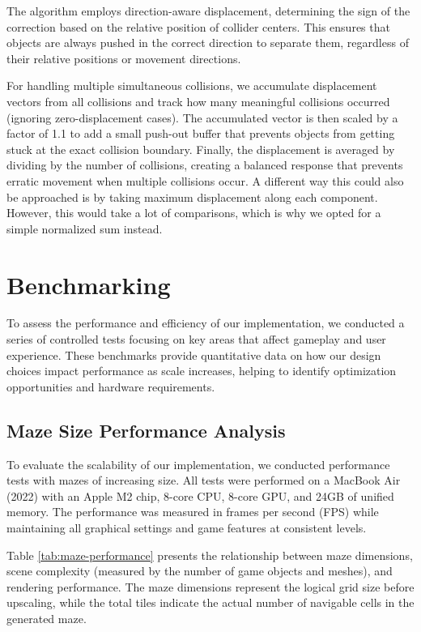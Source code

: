 \documentclass{article}
\begin{document}
The algorithm employs direction-aware displacement, determining the sign of the
correction based on the relative position of collider centers. This ensures
that objects are always pushed in the correct direction to separate them,
regardless of their relative positions or movement directions.

For handling multiple simultaneous collisions, we accumulate displacement
vectors from all collisions and track how many meaningful collisions occurred
(ignoring zero-displacement cases). The accumulated vector is then scaled by a
factor of 1.1 to add a small push-out buffer that prevents objects from getting
stuck at the exact collision boundary. Finally, the displacement is averaged by
dividing by the number of collisions, creating a balanced response that
prevents erratic movement when multiple collisions occur. A different way this
could also be approached is by taking maximum displacement along each
component. However, this would take a lot of comparisons, which is why
we opted for a simple normalized sum instead.

\section{Benchmarking}\label{sec:benchmarking}
To assess the performance and efficiency of our implementation, we conducted a series of controlled tests focusing on key areas that affect gameplay and user experience. These benchmarks provide quantitative data on how our design choices impact performance as scale increases, helping to identify optimization opportunities and hardware requirements.

\subsection{Maze Size Performance Analysis}
To evaluate the scalability of our implementation, we conducted performance tests with mazes of increasing size. All tests were performed on a MacBook Air (2022) with an Apple M2 chip, 8-core CPU, 8-core GPU, and 24GB of unified memory. The performance was measured in frames per second (FPS) while maintaining all graphical settings and game features at consistent levels.

Table \ref{tab:maze-performance} presents the relationship between maze dimensions, scene complexity (measured by the number of game objects and meshes), and rendering performance. The maze dimensions represent the logical grid size before upscaling, while the total tiles indicate the actual number of navigable cells in the generated maze.
\end{document}
